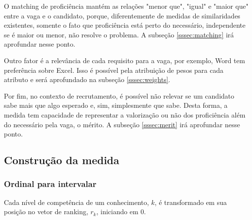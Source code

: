 \documentclass[preprint,12pt]{elsarticle}
\begin{document}
O matching de proficiência mantém as relações "menor que", "igual" e "maior que" entre a vaga e o candidato, porque, diferentemente de medidas de similaridades existentes, somente o fato que proficiência está perto do necessário, independente se é maior ou menor, não resolve o problema. A subseção \ref{sssec:matching} irá aprofundar nesse ponto.

Outro fator é a relevância de cada requisito para a vaga, por exemplo, Word tem preferência sobre Excel. Isso é possível pela atribuição de pesos para cada atributo e será aprofundado na subseção \ref{sssec:weights}.

Por fim, no contexto de recrutamento, é possível não relevar se um candidato sabe mais que algo esperado e, sim, simplesmente que sabe. Desta forma, a medida tem capacidade de representar a valorização ou não dos proficiência além do necessário pela vaga, o mérito. A subseção \ref{sssec:merit} irá aprofundar nesse ponto.





\subsection{Construção da medida}


\subsubsection{Ordinal para intervalar}
\label{sssec:ordinal-interval}
Cada nível de competência de um conhecimento, $k$, é transformado em sua posição no vetor de ranking, $r_k$, iniciando em 0.
    
\end{document}
